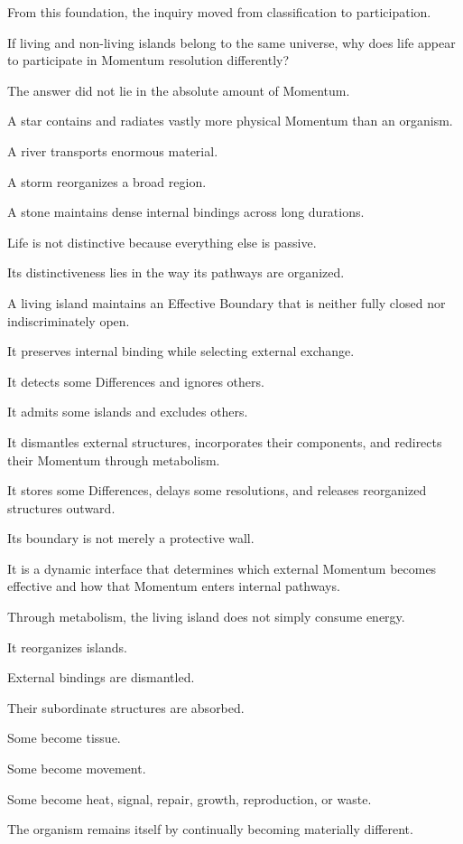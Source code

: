 From this foundation, the inquiry moved from classification to participation.

If living and non-living islands belong to the same universe, why does life appear to participate in Momentum resolution differently?

The answer did not lie in the absolute amount of Momentum.

A star contains and radiates vastly more physical Momentum than an organism.

A river transports enormous material.

A storm reorganizes a broad region.

A stone maintains dense internal bindings across long durations.

Life is not distinctive because everything else is passive.

Its distinctiveness lies in the way its pathways are organized.

A living island maintains an Effective Boundary that is neither fully closed nor indiscriminately open.

It preserves internal binding while selecting external exchange.

It detects some Differences and ignores others.

It admits some islands and excludes others.

It dismantles external structures, incorporates their components, and redirects their Momentum through metabolism.

It stores some Differences, delays some resolutions, and releases reorganized structures outward.

Its boundary is not merely a protective wall.

It is a dynamic interface that determines which external Momentum becomes effective and how that Momentum enters internal pathways.

Through metabolism, the living island does not simply consume energy.

It reorganizes islands.

External bindings are dismantled.

Their subordinate structures are absorbed.

Some become tissue.

Some become movement.

Some become heat, signal, repair, growth, reproduction, or waste.

The organism remains itself by continually becoming materially different.

